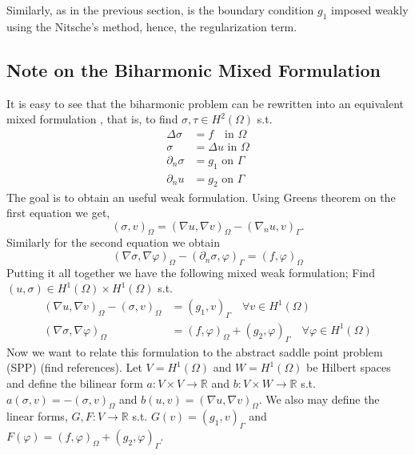 Similarly, as in the previous section, is the boundary condition $g_{1}$ imposed weakly using the Nitsche's method, hence, the regularization term.


\subsection{Note on the Biharmonic Mixed Formulation}%
\label{subsec:biharmonic_mixed_formulation}

It is easy to see that the biharmonic problem can be rewritten into an equivalent mixed formulation , that is, to find $\sigma, \tau  \in H^2( \Omega ) $ s.t. \[
    \begin{split}
\Delta \sigma  & = f \quad  \text{in } \Omega \\
\sigma   & = \Delta u  \text{ in } \Omega \\
\partial _{n} \sigma  & = g_{1} \text{ on } \Gamma  \\
\partial _{n} u   & = g_{2} \text{ on } \Gamma
    \end{split}
\]
The goal is to obtain an useful weak formulation. Using Greens theorem on the first equation we get,
\[
( \sigma, v)_{\Omega } = ( \nabla  u , \nabla v  )_{\Omega } - ( \nabla _{n} u , v) _{\Gamma }.
\]
Similarly for the second equation we obtain
\[
( \nabla \sigma , \nabla \varphi  )_{\Omega} - ( \partial _{n} \sigma ,  \varphi )_{\Gamma } = ( f,\varphi ) _{\Omega}
\]
Putting it all together we have the following mixed weak formulation; Find $( u, \sigma ) \in H^{1}( \Omega ) \times H^{1}( \Omega )  $ s.t. \[
    \begin{split}
     ( \nabla  u , \nabla v  )_{\Omega } -( \sigma, v)_{\Omega }  & =   ( g_{1} , v) _{\Gamma } \quad  \forall v \in H^{1}( \Omega ) \\
( \nabla \sigma , \nabla \varphi  )_{\Omega}  & = ( f,\varphi ) _{\Omega} + ( g_{2} ,  \varphi )_{\Gamma } \quad  \forall \varphi \in H^{1}( \Omega )
    \end{split}
\]
Now we want to relate this formulation to the abstract saddle point problem (SPP) (find references).
Let $V = H^{1}( \Omega ) $  and $W=H^{1}( \Omega ) $ be  Hilbert spaces and define the bilinear form $a: V\times V \to \mathbb{R}  $ and $b: V \times W \to \mathbb{R} $ s.t. $a( \sigma,v ) = - ( \sigma , v) _{\Omega }  $ and $b( u,v) = ( \nabla u,
\nabla v)_{\Omega  }  $. We also may define the linear forms, $G,F: V \to \mathbb{R} $ s.t. $ G( v)  = ( g_{1}, v) _{\Gamma } $ and $F( \varphi ) = ( f, \varphi )_{\Omega } + ( g_{2}, \varphi )_{\Gamma } $.


